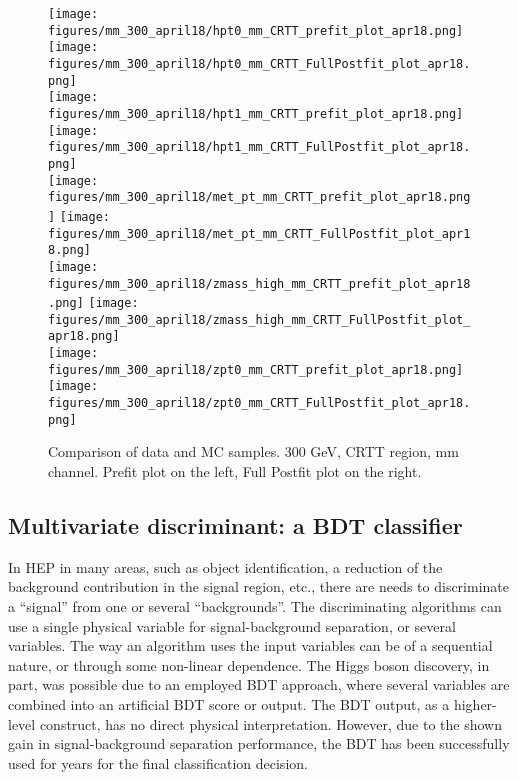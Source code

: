 \begin{small}
\begin{figure}[H]
  \begin{center}
    \texttt{[image: figures/mm\_300\_april18/hpt0\_mm\_CRTT\_prefit\_plot\_apr18.png]}
    \texttt{[image: figures/mm\_300\_april18/hpt0\_mm\_CRTT\_FullPostfit\_plot\_apr18.png]}\\
    \texttt{[image: figures/mm\_300\_april18/hpt1\_mm\_CRTT\_prefit\_plot\_apr18.png]}
    \texttt{[image: figures/mm\_300\_april18/hpt1\_mm\_CRTT\_FullPostfit\_plot\_apr18.png]}\\
    \texttt{[image: figures/mm\_300\_april18/met\_pt\_mm\_CRTT\_prefit\_plot\_apr18.png]}
    \texttt{[image: figures/mm\_300\_april18/met\_pt\_mm\_CRTT\_FullPostfit\_plot\_apr18.png]}\\
    \texttt{[image: figures/mm\_300\_april18/zmass\_high\_mm\_CRTT\_prefit\_plot\_apr18.png]}
    \texttt{[image: figures/mm\_300\_april18/zmass\_high\_mm\_CRTT\_FullPostfit\_plot\_apr18.png]}\\
    \texttt{[image: figures/mm\_300\_april18/zpt0\_mm\_CRTT\_prefit\_plot\_apr18.png]}
    \texttt{[image: figures/mm\_300\_april18/zpt0\_mm\_CRTT\_FullPostfit\_plot\_apr18.png]}\\
    \caption[Data-MC comparison in CRTT, other variables.]{Comparison of data and MC samples. 300 GeV, CRTT region, mm channel. Prefit plot on the left,           Full Postfit plot on the right.}
    \label{fig:MCcomparisons_mm_low_CRTT_2}
  \end{center}
\end{figure}

\subsection{Multivariate discriminant: a BDT classifier}

In HEP in many areas, such as object identification, a reduction of the background contribution in the signal region, etc., there are needs to discriminate a ``signal'' from one or several ``backgrounds''. The discriminating algorithms can use a single physical variable for signal-background separation, or several variables. The way an algorithm uses the input variables can be of a sequential nature, or through some non-linear dependence. The Higgs boson discovery, in part, was possible due to an employed BDT approach, where several variables are combined into an artificial BDT score or output. The BDT output, as a higher-level construct, has no direct physical interpretation. However, due to the shown gain in signal-background separation performance, the BDT has been successfully used for years for the final classification decision. 


\end{small}

